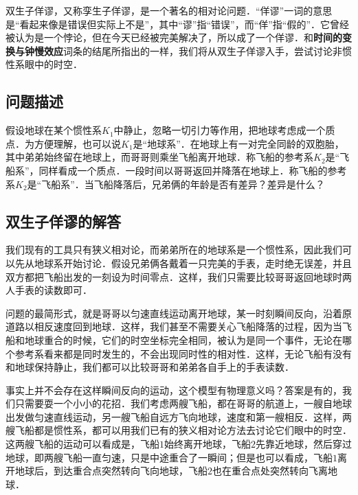 
双生子佯谬，又称孪生子佯谬，是一个著名的相对论问题．“佯谬”一词的意思是“看起来像是错误但实际上不是”，其中“谬”指“错误”，而“佯”指“假的”．它曾经被认为是一个悖论，但在今天已经被完美解决了，所以成了一个佯谬．和\textbf{时间的变换与钟慢效应}词条的结尾所指出的一样，我们将从双生子佯谬入手，尝试讨论非惯性系眼中的时空．

\subsection{问题描述}

假设地球在某个惯性系$K_1$中静止，忽略一切引力等作用，把地球考虑成一个质点．为方便理解，也可以说$K_1$是“地球系”．在地球上有一对完全同龄的双胞胎，其中弟弟始终留在地球上，而哥哥则乘坐飞船离开地球．称飞船的参考系$K_2$是“飞船系”，同样看成一个质点．一段时间以哥哥返回并降落在地球上．称飞船的参考系$K_2$是“飞船系”．当飞船降落后，兄弟俩的年龄是否有差异？差异是什么？

\subsection{双生子佯谬的解答}

我们现有的工具只有狭义相对论，而弟弟所在的地球系是一个惯性系，因此我们可以先从地球系开始讨论．假设兄弟俩各戴着一只完美的手表，走时绝无误差，并且双方都把飞船出发的一刻设为时间零点．这样，我们只需要比较哥哥返回地球时两人手表的读数即可．

问题的最简形式，就是哥哥以匀速直线运动离开地球，某一时刻瞬间反向，沿着原道路以相反速度回到地球．这样，我们甚至不需要关心飞船降落的过程，因为当飞船和地球重合的时候，它们的时空坐标完全相同，被认为是同一个事件，无论在哪个参考系看来都是同时发生的，不会出现同时性的相对性．这样，无论飞船有没有和地球保持静止，我们都可以比较哥哥和弟弟各自手上的手表读数．

事实上并不会存在这样瞬间反向的运动，这个模型有物理意义吗？答案是有的，我们只需要耍一个小小的花招．我们考虑两艘飞船，都在哥哥的航道上，一艘自地球出发做匀速直线运动，另一艘飞船自远方飞向地球，速度和第一艘相反．这样，两艘飞船都是惯性系，都可以用我们已有的狭义相对论方法去讨论它们眼中的时空．这两艘飞船的运动可以看成是，飞船$1$始终离开地球，飞船$2$先靠近地球，然后穿过地球，即两艘飞船一直匀速，只是中途重合了一瞬间；但是也可以看成，飞船$1$离开地球后，到达重合点突然转向飞向地球，飞船$2$也在重合点处突然转向飞离地球．






